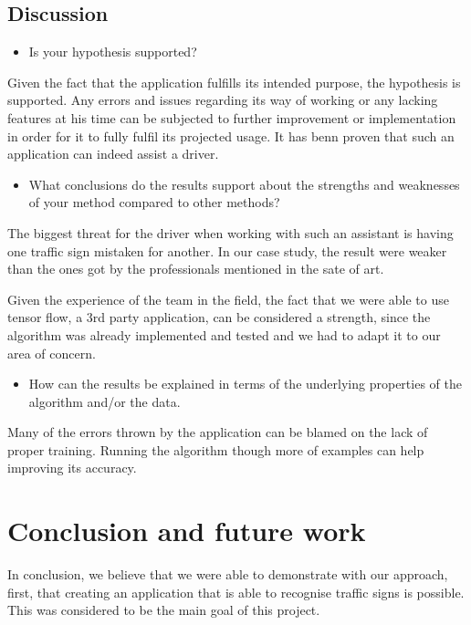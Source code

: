 \documentclass[runningheads,a4paper,11pt]{report}
\begin{document}
\section{Discussion}
\label{section:discussion}

\begin{itemize}
	\item Is your hypothesis supported? 
\end{itemize}

Given the fact that the application fulfills its intended purpose, the hypothesis is supported. Any errors and issues regarding its way of working or any lacking features at his time can be subjected to further improvement or implementation in order for it to fully fulfil its projected usage. It has benn proven that such an application can indeed assist a driver.

\begin{itemize}
	\item What conclusions do the results support about the strengths and weaknesses of your method compared to other methods? 
\end{itemize}

The biggest threat for the driver when working with such an assistant is having one traffic sign mistaken for another. In our case study, the result were weaker than the ones got by the professionals mentioned in the sate of art. 

Given the experience of the team in the field, the fact that we were able to use tensor flow, a 3rd party application, can be considered a strength, since the algorithm was already implemented and tested and we had to adapt it to our area of concern.

\begin{itemize}
	\item How can the results be explained in terms of the underlying properties of the algorithm and/or the data. 
\end{itemize}

Many of the errors thrown by the application can be blamed on the lack of proper training. Running the algorithm though more of examples can help improving its accuracy.

\chapter{Conclusion and future work}
\label{chapter:concl}

In conclusion, we believe that we were able to demonstrate with our approach, first, that creating an application that is able to recognise traffic signs is possible. This was considered to be the main goal of this project. 
\end{document}
